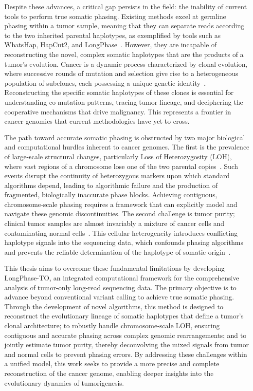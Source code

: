 \documentclass[pdflatex,sn-nature]{sn-jnl}
\begin{document}
Despite these advances, a critical gap persists in the field: the inability of current tools to perform true somatic phasing. Existing methods excel at germline phasing within a tumor sample, meaning that they can separate reads according to the two inherited parental haplotypes, as exemplified by tools such as WhatsHap, HapCut2, and LongPhase~\cite{martin2016, edge2017, lin2022}. However, they are incapable of reconstructing the novel, complex somatic haplotypes that are the products of a tumor's evolution. Cancer is a dynamic process characterized by clonal evolution, where successive rounds of mutation and selection give rise to a heterogeneous population of subclones, each possessing a unique genetic identity~\cite{nowell1976}. Reconstructing the specific somatic haplotypes of these clones is essential for understanding co-mutation patterns, tracing tumor lineage, and deciphering the cooperative mechanisms that drive malignancy. This represents a frontier in cancer genomics that current methodologies have yet to cross.

The path toward accurate somatic phasing is obstructed by two major biological and computational hurdles inherent to cancer genomes. The first is the prevalence of large-scale structural changes, particularly Loss of Heterozygosity (LOH), where vast regions of a chromosome lose one of the two parental copies~\cite{nichols2020, regan2024, hwang2021}. Such events disrupt the continuity of heterozygous markers upon which standard algorithms depend, leading to algorithmic failure and the production of fragmented, biologically inaccurate phase blocks. Achieving contiguous, chromosome-scale phasing requires a framework that can explicitly model and navigate these genomic discontinuities. The second challenge is tumor purity; clinical tumor samples are almost invariably a mixture of cancer cells and contaminating normal cells~\cite{yadav2015, zheng2017, rhee2018}. This cellular heterogeneity introduces conflicting haplotype signals into the sequencing data, which confounds phasing algorithms and prevents the reliable determination of the haplotype of somatic origin~\cite{foltz2024}.

This thesis aims to overcome these fundamental limitations by developing LongPhase-TO, an integrated computational framework for the comprehensive analysis of tumor-only long-read sequencing data. The primary objective is to advance beyond conventional variant calling to achieve true somatic phasing. Through the development of novel algorithms, this method is designed to reconstruct the evolutionary lineage of somatic haplotypes that define a tumor's clonal architecture; to robustly handle chromosome-scale LOH, ensuring contiguous and accurate phasing across complex genomic rearrangements; and to jointly estimate tumor purity, thereby deconvolving the mixed signals from tumor and normal cells to prevent phasing errors. By addressing these challenges within a unified model, this work seeks to provide a more precise and complete reconstruction of the cancer genome, enabling deeper insights into the evolutionary dynamics of tumorigenesis.
\end{document}

